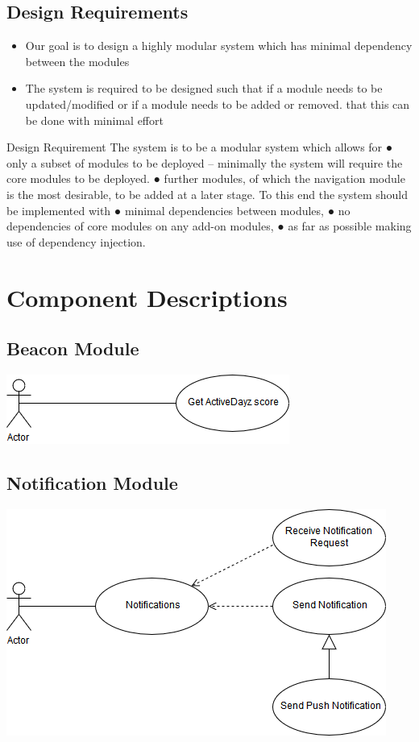 \documentclass[11pt]{article}
\begin{document}
\subsection{Design Requirements}
\begin{itemize}
\item Our goal is to design a highly modular system which has minimal dependency between the modules
\item The system is required to be designed such that if a module needs to be updated/modified or if a module needs to be added or removed. that this can be done with minimal effort
\end{itemize}



Design Requirement
The system is to be a modular system which allows for
● only a subset of modules to be deployed -- minimally the system will require
the core modules to be deployed.
● further modules, of which the navigation module is the most desirable, to be
added at a later stage.
To this end the system should be implemented with
● minimal dependencies between modules,
● no dependencies of core modules on any add-on modules,
● as far as possible making use of dependency injection.

\section{Component Descriptions}
\subsection{Beacon Module}
\includegraphics[width=0.7\linewidth]{images/Beacon.png}\\[1cm]
\subsection{Notification Module}
\includegraphics[width=0.7\linewidth]{images/Notification.png}\\[1cm]
\end{document}
